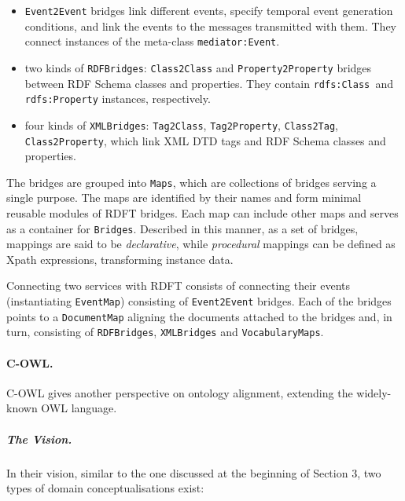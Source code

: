 \begin{itemize}
\item \texttt{Event2Event} bridges link different events,
specify temporal event generation conditions, and link the events to
the messages transmitted with them. They connect instances of the
meta-class \texttt{mediator:Event}. 
\item two kinds of \texttt{RDFBridges}:
\texttt{Class2Class} and
\texttt{Property2Property} bridges between RDF Schema
classes and properties. They contain \texttt{rdfs:Class
}and \texttt{rdfs:Property} instances, respectively. 
\item four kinds of \texttt{XMLBridges}:
\texttt{Tag2Class}, \texttt{Tag2Property},
\texttt{Class2Tag}, \texttt{Class2Property},
which link XML DTD tags and RDF Schema classes and properties. 
\end{itemize}
The bridges are grouped into \texttt{Maps}, which are
collections of bridges serving a single purpose. The maps are
identified by their names and form minimal reusable modules of RDFT
bridges. Each map can include other maps and serves as a container for
\texttt{Bridges}. Described in this manner, as a set of
bridges, mappings are said to be \textit{declarative}, while
\textit{procedural} mappings can be defined as Xpath \cite{clark1999xpath} expressions, transforming instance data. 

Connecting two services with RDFT consists of connecting their events
(instantiating \texttt{EventMap}) consisting of
\texttt{Event2Event} bridges. Each of the bridges points
to a \texttt{DocumentMap} aligning the documents attached
to the bridges and, in turn, consisting of
\texttt{RDFBridges}, \texttt{XMLBridges} and
\texttt{VocabularyMaps}. 

\paragraph{C-OWL.}
C-OWL \cite{bouquet2004cowl} gives another perspective on ontology
alignment, extending the widely-known OWL \cite{dean2004owl}
language. 

\subparagraph{The Vision.}
In their vision, similar to the one discussed at the beginning of
Section 3, two types of domain conceptualisations exist: 


